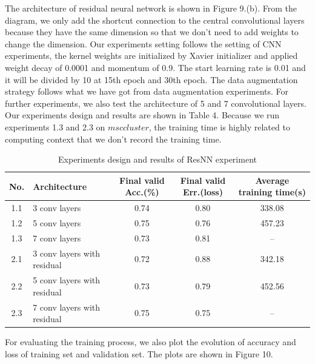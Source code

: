 \documentclass[]{article}
\begin{document}
The architecture of residual neural network is shown in Figure 9.(b). From the diagram, we only add the shortcut connection to the central convolutional layers because they have the same dimension so that we don't need to add weights to change the dimension. Our experiments setting follows the setting of CNN experiments, the kernel weights are initialized by Xavier initializer and applied weight decay of 0.0001 and momentum of 0.9. The start learning rate is 0.01 and it will be divided by 10 at 15th epoch and 30th epoch. The data augmentation strategy follows what we have got from data augmentation experiments. For further experiments, we also test the architecture of 5 and 7 convolutional layers. Our experiments design and results are shown in Table 4. Because we run experiments 1.3 and 2.3 on $msccluster$, the training time is highly related to computing context that we don't record the training time.

\begin{table}[ht]
\centering 
\caption{Experiments design and results of ResNN experiment}
\begin{tabular}{c l c c c}
\toprule
No. & Architecture & Final valid Acc.(\%) & Final valid Err.(loss) & Average training time(s)\\
\midrule
1.1 & 3 conv layers & 0.74 & 0.80 & 338.08 \\
1.2 & 5 conv layers & 0.75 & 0.76 & 457.23 \\
1.3 & 7 conv layers & 0.73 & 0.81 & --  \\
\midrule
2.1 & 3 conv layers with residual & 0.72 & 0.88 & 342.18 \\
2.2 & 5 conv layers with residual & 0.73 & 0.79 & 452.56 \\
2.3 & 7 conv layers with residual & 0.75 & 0.75 & --  \\
\bottomrule
\end{tabular}
\end{table}

For evaluating the training process, we also plot the evolution of accuracy and loss of training set and validation set. The plots are shown in Figure 10. 
\end{document}
